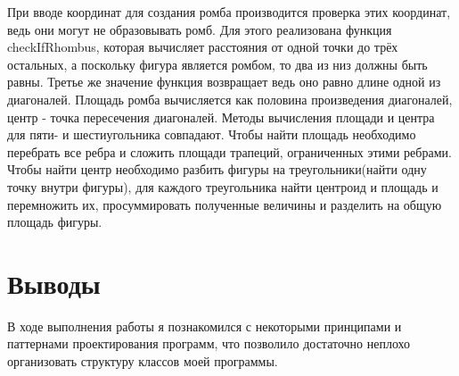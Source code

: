 \documentclass[a4paper, 12pt]{article}
\begin{document}
При вводе координат для создания ромба производится проверка этих координат, ведь они могут не образовывать ромб. Для этого реализована функция checkIfRhombus, которая вычисляет расстояния от одной точки до трёх остальных, а поскольку фигура является ромбом, то два из низ должны быть равны. Третье же значение функция возвращает ведь оно равно длине одной из диагоналей. Площадь ромба вычисляется как половина произведения диагоналей, центр - точка пересечения диагоналей. Методы вычисления площади и центра для пяти- и шестиугольника совпадают. Чтобы найти площадь необходимо перебрать все ребра и сложить площади трапеций, ограниченных этими ребрами. Чтобы найти центр необходимо разбить фигуры на треугольники(найти одну точку внутри фигуры), для каждого треугольника найти центроид и площадь и перемножить их, просуммировать полученные величины и разделить на общую площадь фигуры.   

\newpage
\section{Выводы}

В ходе выполнения работы я познакомился с некоторыми принципами и паттернами проектирования программ, что позволило достаточно неплохо организовать структуру классов моей программы.
\end{document}

